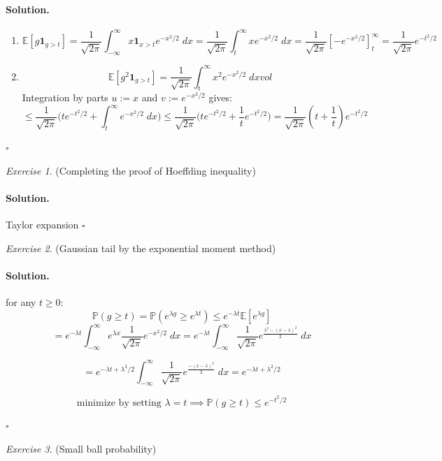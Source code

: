 \documentclass[11pt]{article}
\theoremstyle{definition}
\theoremstyle{remark}
\newtheorem{exercise}{Exercise}[section]
\newenvironment{solution}{\paragraph{Solution.}}{\hfill$\square$\medskip}
\newcommand{\E}{\mathbb{E}}
\newcommand{\Prob}{\mathbb{P}}
\newcommand{\1}{\mathbf{1}}
\begin{document}
\begin{solution}
	\begin{enumerate}
		\item 
		\[
		\E[g \1_{g>t}] =  \frac{1}{\sqrt{2\pi}} \int_{-\infty}^\infty x \1_{x>t} e^{-x^2/2}\; dx
		=  \frac{1}{\sqrt{2\pi}} \int_{t}^\infty x e^{-x^2/2}\; dx =  \frac{1}{\sqrt{2\pi}} [-e^{-x^2/2} ]_{t}^\infty =  \frac{1}{\sqrt{2\pi}} e^{-t^2/2}
		\]
		
		\item
		\[
		\E[g^2 \1_{g>t}] = \frac{1}{\sqrt{2\pi}} \int_{t}^\infty x^2 e^{-x^2/2}\; dx
vol		\]
		Integration by parts \(u:= x\) and \(v := e^{-x^2/2}\) gives:
		\[
		\leq \frac{1}{\sqrt{2\pi}} \big( te^{-t^2/2} +  \int_{t}^\infty e^{-x^2/2}\; dx \big) \leq \frac{1}{\sqrt{2\pi}} \big( te^{-t^2/2} + \frac{1}{t} e^{-t^2/2} \big) = \frac{1}{\sqrt{2\pi}} (t + \frac{1}{t}) e^{-t^2/2}
		\]
	\end{enumerate}
\end{solution}


\begin{exercise}
	(Completing the proof of Hoeffding inequality)
\end{exercise}
\begin{solution}
	Taylor expansion
\end{solution}

\begin{exercise}
	(Gaussian tail by the exponential moment method)
\end{exercise}

\begin{solution}
	for any \(t \geq 0\):
	\[
	\Prob(g \geq t) = \Prob(e^{\lambda g} \geq e^{\lambda t}) \leq e^{-\lambda t} \E[e^{\lambda g} ]
	\]
	\[
	= e^{-\lambda t} \int_{-\infty}^{\infty} e^{\lambda x} \frac{1}{\sqrt{2\pi}} e^{-x^2/2}\; dx = 
	e^{-\lambda t} \int_{-\infty}^{\infty} \frac{1}{\sqrt{2\pi}} e^{\frac{\lambda^2-(x-\lambda)^2}{2}}\; dx
	\]
	
	\[
	= e^{-\lambda t + \lambda^2/2} \int_{-\infty}^{\infty} \frac{1}{\sqrt{2\pi}} e^{\frac{-(x-\lambda)^2}{2}}\; dx =  e^{-\lambda t + \lambda^2/2}
	\]
	
	\[
	\text{minimize by setting } \lambda = t \implies \Prob(g \geq t) \leq e^{-t^2/2}
	\]
	
\end{solution}


\begin{exercise}
	(Small ball probability)
\end{exercise}
\end{document}
